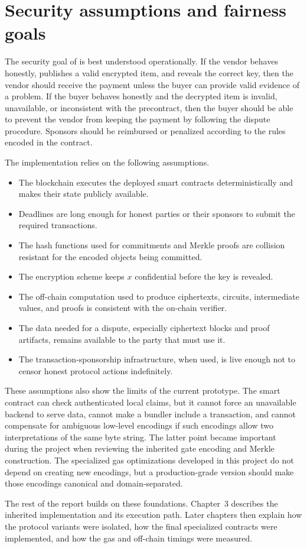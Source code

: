 \section{Security assumptions and fairness goals}

The security goal of \sox{} is best understood operationally. If the vendor behaves honestly,
publishes a valid encrypted item, and reveals the correct key, then the vendor should receive
the payment unless the buyer can provide valid evidence of a problem. If the buyer behaves
honestly and the decrypted item is invalid, unavailable, or inconsistent with the
precontract, then the buyer should be able to prevent the vendor from keeping the payment by
following the dispute procedure. Sponsors should be reimbursed or penalized according to the
rules encoded in the contract.

The implementation relies on the following assumptions.

\begin{itemize}
  \item The blockchain executes the deployed smart contracts deterministically and makes their
  state publicly available.
  \item Deadlines are long enough for honest parties or their sponsors to submit the required
  transactions.
  \item The hash functions used for commitments and Merkle proofs are collision resistant for
  the encoded objects being committed.
  \item The encryption scheme keeps \(x\) confidential before the key is revealed.
  \item The off-chain computation used to produce ciphertexts, circuits, intermediate values,
  and proofs is consistent with the on-chain verifier.
  \item The data needed for a dispute, especially ciphertext blocks and proof artifacts,
  remains available to the party that must use it.
  \item The transaction-sponsorship infrastructure, when used, is live enough not to censor
  honest protocol actions indefinitely.
\end{itemize}

These assumptions also show the limits of the current prototype. The smart contract can
check authenticated local claims, but it cannot force an unavailable backend to serve data,
cannot make a bundler include a transaction, and cannot compensate for ambiguous low-level
encodings if such encodings allow two interpretations of the same byte string. The latter
point became important during the project when reviewing the inherited gate encoding and
Merkle construction. The specialized gas optimizations developed in this project do not
depend on creating new encodings, but a production-grade version should make those encodings
canonical and domain-separated.

The rest of the report builds on these foundations. Chapter~3 describes the inherited
implementation and its execution path. Later chapters then explain how the protocol variants
were isolated, how the final specialized contracts were implemented, and how the gas and
off-chain timings were measured.
